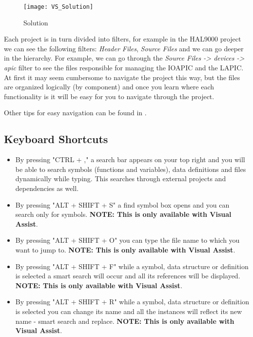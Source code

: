 \begin{appendices}
\begin{figure}
	\centering
	\texttt{[image: VS\_Solution]}
		\caption{\projectname Solution}
	\label{fig:VSSolution}
\end{figure}

Each project is in turn divided into filters, for example in the HAL9000 project we can see the
following filters: \textit{Header Files}, \textit{Source Files} and we can go deeper in the hierarchy.
For example, we can go through the \textit{Source Files -> devices -> apic} filter to see the files
responsible for managing the IOAPIC and the LAPIC. At first it may seem cumbersome to navigate the
project this way, but the files are organized logically (by component) and once you learn where each
functionality is it will be easy for you to navigate through the project.

Other tips for easy navigation can be found in .

\subsection{Keyboard Shortcuts}
\label{sect:KeyboardShortcuts}

\begin{itemize}
	\item By pressing "CTRL + ," a search bar appears on your top right and you will be able to
search symbols (functions and variables), data definitions and files dynamically while typing. This
searches through external projects and dependencies as well.

	\item By pressing "ALT + SHIFT + S" a find symbol box opens and you can search only for symbols.
\textbf{NOTE: This is only available with Visual Assist}.

	\item By pressing "ALT + SHIFT + O" you can type the file name to which you want to jump to.
\textbf{NOTE: This is only available with Visual Assist}.

	\item By pressing "ALT + SHIFT + F" while a symbol, data structure or definition is selected
a smart search will occur and all its references will be displayed. \textbf{NOTE: This is only
available with Visual Assist}.

	\item By pressing "ALT + SHIFT + R" while a symbol, data structure or definition is selected
you can change its name and all the instances will reflect its new name - smart search and replace.
\textbf{NOTE: This is only available with Visual Assist}.


\end{itemize}
\end{appendices}

